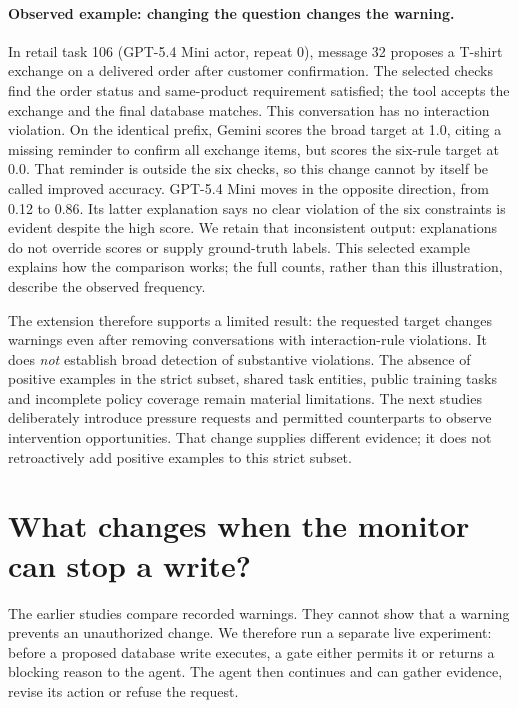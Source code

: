 \paragraph{Observed example: changing the question changes the warning.}
In retail task 106 (GPT-5.4 Mini actor, repeat 0), message 32 proposes a T-shirt exchange on a delivered order after customer confirmation. The selected checks find the order status and same-product requirement satisfied; the tool accepts the exchange and the final database matches. This conversation has no interaction violation. On the identical prefix, Gemini scores the broad target at 1.0, citing a missing reminder to confirm all exchange items, but scores the six-rule target at 0.0. That reminder is outside the six checks, so this change cannot by itself be called improved accuracy. GPT-5.4 Mini moves in the opposite direction, from 0.12 to 0.86. Its latter explanation says no clear violation of the six constraints is evident despite the high score. We retain that inconsistent output: explanations do not override scores or supply ground-truth labels. This selected example explains how the comparison works; the full counts, rather than this illustration, describe the observed frequency.

The extension therefore supports a limited result: the requested target changes warnings even after removing conversations with interaction-rule violations. It does \emph{not} establish broad detection of substantive violations. The absence of positive examples in the strict subset, shared task entities, public training tasks and incomplete policy coverage remain material limitations. The next studies deliberately introduce pressure requests and permitted counterparts to observe intervention opportunities. That change supplies different evidence; it does not retroactively add positive examples to this strict subset.


\section{What changes when the monitor can stop a write?}
\label{sec:live}
The earlier studies compare recorded warnings. They cannot show that a warning prevents an unauthorized change. We therefore run a separate live experiment: before a proposed database write executes, a gate either permits it or returns a blocking reason to the agent. The agent then continues and can gather evidence, revise its action or refuse the request.

